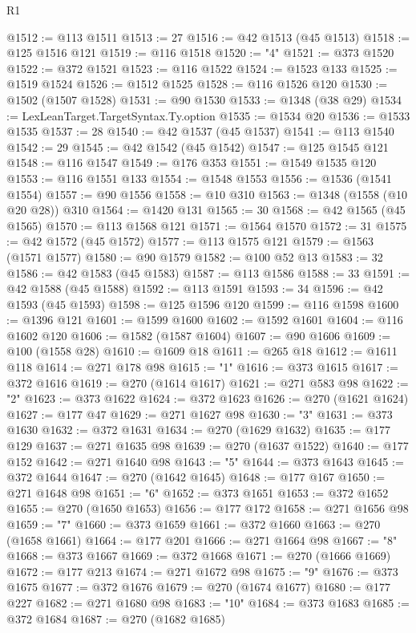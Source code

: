 \begin{lexlean}{R1}
\begin{coremodule}
@1512 := @113 @1511
@1513 := 27
@1516 := @42 @1513 (@45 @1513)
@1518 := @125 @1516 @121
@1519 := @116 @1518
@1520 := "4"
@1521 := @373 @1520
@1522 := @372 @1521
@1523 := @116 @1522
@1524 := @1523 @133
@1525 := @1519 @1524
@1526 := @1512 @1525
@1528 := @116 @1526 @120
@1530 := @1502 (@1507 @1528)
@1531 := @90 @1530
@1533 := @1348 (@38 @29)
@1534 := LexLeanTarget.TargetSyntax.Ty.option
@1535 := @1534 @20
@1536 := @1533 @1535
@1537 := 28
@1540 := @42 @1537 (@45 @1537)
@1541 := @113 @1540
@1542 := 29
@1545 := @42 @1542 (@45 @1542)
@1547 := @125 @1545 @121
@1548 := @116 @1547
@1549 := @176 @353
@1551 := @1549 @1535 @120
@1553 := @116 @1551 @133
@1554 := @1548 @1553
@1556 := @1536 (@1541 @1554)
@1557 := @90 @1556
@1558 := @10 @310
@1563 := @1348 (@1558 (@10 @20 @28)) @310
@1564 := @1420 @131
@1565 := 30
@1568 := @42 @1565 (@45 @1565)
@1570 := @113 @1568 @121
@1571 := @1564 @1570
@1572 := 31
@1575 := @42 @1572 (@45 @1572)
@1577 := @113 @1575 @121
@1579 := @1563 (@1571 @1577)
@1580 := @90 @1579
@1582 := @100 @52 @13
@1583 := 32
@1586 := @42 @1583 (@45 @1583)
@1587 := @113 @1586
@1588 := 33
@1591 := @42 @1588 (@45 @1588)
@1592 := @113 @1591
@1593 := 34
@1596 := @42 @1593 (@45 @1593)
@1598 := @125 @1596 @120
@1599 := @116 @1598
@1600 := @1396 @121
@1601 := @1599 @1600
@1602 := @1592 @1601
@1604 := @116 @1602 @120
@1606 := @1582 (@1587 @1604)
@1607 := @90 @1606
@1609 := @100 (@1558 @28)
@1610 := @1609 @18
@1611 := @265 @18
@1612 := @1611 @118
@1614 := @271 @178 @98
@1615 := "1"
@1616 := @373 @1615
@1617 := @372 @1616
@1619 := @270 (@1614 @1617)
@1621 := @271 @583 @98
@1622 := "2"
@1623 := @373 @1622
@1624 := @372 @1623
@1626 := @270 (@1621 @1624)
@1627 := @177 @47
@1629 := @271 @1627 @98
@1630 := "3"
@1631 := @373 @1630
@1632 := @372 @1631
@1634 := @270 (@1629 @1632)
@1635 := @177 @129
@1637 := @271 @1635 @98
@1639 := @270 (@1637 @1522)
@1640 := @177 @152
@1642 := @271 @1640 @98
@1643 := "5"
@1644 := @373 @1643
@1645 := @372 @1644
@1647 := @270 (@1642 @1645)
@1648 := @177 @167
@1650 := @271 @1648 @98
@1651 := "6"
@1652 := @373 @1651
@1653 := @372 @1652
@1655 := @270 (@1650 @1653)
@1656 := @177 @172
@1658 := @271 @1656 @98
@1659 := "7"
@1660 := @373 @1659
@1661 := @372 @1660
@1663 := @270 (@1658 @1661)
@1664 := @177 @201
@1666 := @271 @1664 @98
@1667 := "8"
@1668 := @373 @1667
@1669 := @372 @1668
@1671 := @270 (@1666 @1669)
@1672 := @177 @213
@1674 := @271 @1672 @98
@1675 := "9"
@1676 := @373 @1675
@1677 := @372 @1676
@1679 := @270 (@1674 @1677)
@1680 := @177 @227
@1682 := @271 @1680 @98
@1683 := "10"
@1684 := @373 @1683
@1685 := @372 @1684
@1687 := @270 (@1682 @1685)

\end{coremodule}
\end{lexlean}
